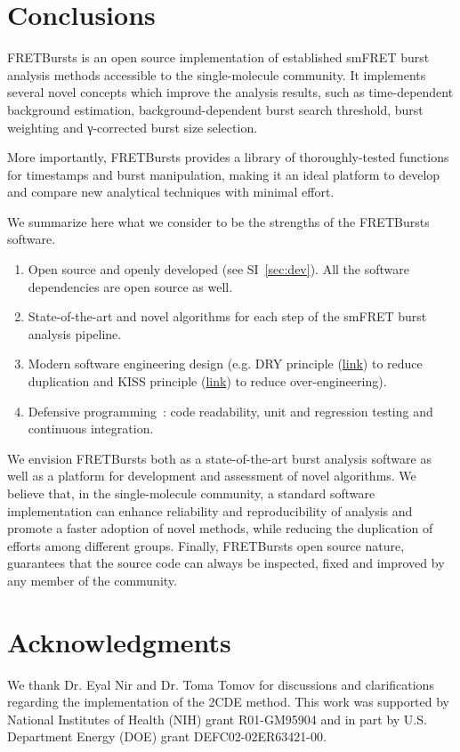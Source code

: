 \section{Conclusions}
\label{sec:conclusions}

FRETBursts is an open source implementation of established smFRET burst analysis methods
accessible to the single-molecule community.
It implements several novel concepts which improve the analysis results, such as
time-dependent background estimation, background-dependent burst search threshold,
burst weighting and γ-corrected burst size selection.

More importantly, FRETBursts provides a library of thoroughly-tested functions
for timestamps and burst manipulation, making it an ideal platform to
develop and compare new analytical techniques with minimal effort.

We summarize here what we consider to be the strengths
of the FRETBursts software.

\begin{enumerate}
\item Open source and openly developed (see SI~\ref{sec:dev}).
All the software dependencies are open source as well.
\item State-of-the-art and novel algorithms for each step of the
smFRET burst analysis pipeline.
\item Modern software engineering design (e.g. DRY principle
(\href{http://en.wikipedia.org/wiki/Don\%27t_repeat_yourself}{link})
to reduce duplication and KISS principle
(\href{http://en.wikipedia.org/wiki/KISS_principle}{link})
to reduce over-engineering).
\item Defensive programming~\cite{Prli__2012}: code readability,
unit and regression testing and continuous integration.
\end{enumerate}

We envision FRETBursts both as a state-of-the-art burst analysis
software as well as a platform for development and assessment of novel algorithms.
We believe that, in the single-molecule community,
a standard software implementation can enhance
reliability and reproducibility of analysis and promote a faster adoption of novel methods, 
while reducing the duplication of efforts among different groups.
Finally, FRETBursts open source nature, guarantees that the source code
can always be inspected, fixed and improved by any member of the community.

\section*{Acknowledgments}
We thank Dr. Eyal Nir and Dr. Toma Tomov for discussions and clarifications regarding the 
implementation of the 2CDE method.
This work was supported by National Institutes of Health (NIH)
grant R01-GM95904 and in part by U.S. Department Energy (DOE) grant DEFC02-02ER63421-00.
